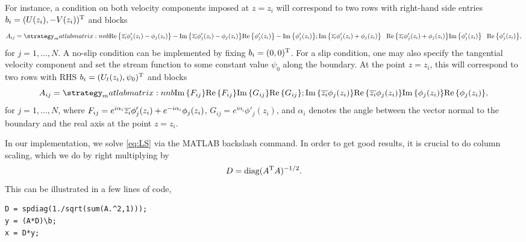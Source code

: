 For instance, a condition on both velocity components imposed at $z=z_i$ will correspond to two rows with right-hand side entries $b_i=(U(z_i), -V(z_i))^{\text{T}}$ and blocks
\begin{equation}
\renewcommand*{\arraystretch}{1.5}
A_{ij}=\matlabmatrix{\real{\conj{z_i}\phi'_j(z_i)-\phi_j(z_i)} -\imag{\conj{z_i}\phi'_j(z_i)-\phi_j(z_i)} \real{\phi'_j(z_i)} -\imag{\phi'_j(z_i)}; 
\imag{\conj{z_i}\phi'_j(z_i)+\phi_j(z_i)} \phantom{+}\real{\conj{z_i}\phi'_j(z_i)+\phi_j(z_i)} \imag{\phi'_j(z_i)} \phantom{+}\real{\phi'_j(z_i)}},
\end{equation}
for $j=1,\ldots,N$. A no-slip condition can be implemented by fixing $b_i=(0,0)^{\text{T}}$.
For a slip condition, one may also specify the tangential velocity component and set the stream function to some constant value $\psi_0$ along the boundary. At the point $z=z_i$, this will correspond to two rows with RHS $b_i=(U_t(z_i),\psi_0)^{\text{T}}$ and blocks
\begin{equation}
\renewcommand*{\arraystretch}{1.5}
A_{ij}=\matlabmatrix{\imag{F_{ij}} \real{F_{ij}} \imag{G_{ij}} \real{G_{ij}}; 
\imag{\conj{z_i}\phi_j(z_i)} \real{\conj{z_i}\phi_j(z_i)} \imag{\phi_j(z_i)} \real{\phi_j(z_i)}},
\end{equation}
for $j=1,\ldots,N$, where $F_{ij}=e^{i\alpha_i}{\overline{z_i}}\phi'_j(z_i)+e^{-i\alpha_i}\phi_j(z_i)$,  $G_{ij}=e^{i\alpha_i}\phi'_j(z_i)$, and $\alpha_i$ denotes the angle between the vector normal to the boundary and the real axis at the point $z=z_i$.

In our implementation, we solve \eqref{eq:LS} via the MATLAB backslash command. In order to get good results, it is crucial to do column scaling, which we do by right multiplying by
\begin{equation}
D=\operatorname{diag}( A^{\text{T}} A)^{-1/2}.
\end{equation} 
This can be illustrated in a few lines of code,
\begin{verbatim}
D = spdiag(1./sqrt(sum(A.^2,1)));
y = (A*D)\b; 
x = D*y;
\end{verbatim}


